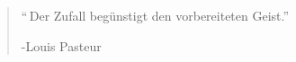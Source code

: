 \begin{frame}
	\large
	\begin{quote}
		\enquote{\,Der Zufall begünstigt den vorbereiteten Geist.}
		\begin{flushright}
			 \upshape-Louis Pasteur\,\cite{QuotePasteur}
		\end{flushright}
	\end{quote}
\end{frame}